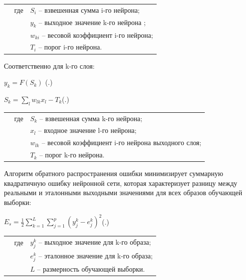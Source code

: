 	\begin{tabular}{p{}p{}p{}}
		& где  & $S_{i}$ {--} взвешенная сумма i-го нейрона; \\
		&      & $y_{k}$ {--} выходное значение k-го нейрона ; \\
		&      & $w_{ki}$ {--} весовой коэффициент i-го нейрона; \\
		&      & $T_{i}$ {--} порог i-го нейрона. \\
	\end{tabular}
	
    \par \redline 	Соответственно для k-го слоя:
	
	\formulaspace \par \redline 
	$y_{k} = F(S_{k}) $
	\hfill (\thechaptercntr .\theformulacntr) \redline
	\formulaspace \addtocounter{formulacntr}{1}
	
	\formulaspace \par \redline 
	$S_{k} = \sum \limits _{l}^{} w_{lk}x_{l} - T_{k}$\hfill (\thechaptercntr .\theformulacntr) \redline
	\formulaspace \addtocounter{formulacntr}{1}
	
	\begin{tabular}{p{}p{}p{}}
		& где  & $S_{k}$ {--} взвешенная сумма k-го нейрона; \\
		&      & $x_{l}$ {--} входное значение l-го нейрона; \\
		&      & $w_{lk}$ {--} весовой коэффициент i-го нейрона выходного слоя; \\
		&      & $T_{k}$ {--} порог k-го нейрона. \\
	\end{tabular}
	
	\par \redline Алгоритм обратного распространения ошибки минимизирует суммарную квадратичную ошибку нейронной сети, которая характеризует разницу между реальными и эталонными выходными значениями для всех образов обучающей выборки:
	
	\formulaspace \par \redline 
	$E_{s} = \frac{1}{2}\sum \limits _{k=1}^{L} \sum \limits _{j=1}^{p} (y_{j}^{k} - e_{j}^{k})^{2} $\hfill (\thechaptercntr .\theformulacntr) \redline
	\formulaspace \addtocounter{formulacntr}{1}
	
	\begin{tabular}{p{}p{}p{}}
		& где  & $y_{j}^{k}$ {--} выходное значение для k-го образа; \\
		&      & $e_{j}^{k}$ {--} эталонное значение для k-го образа; \\
		&      & $L$ {--} размерность обучающей выборки. \\
	\end{tabular}
	
